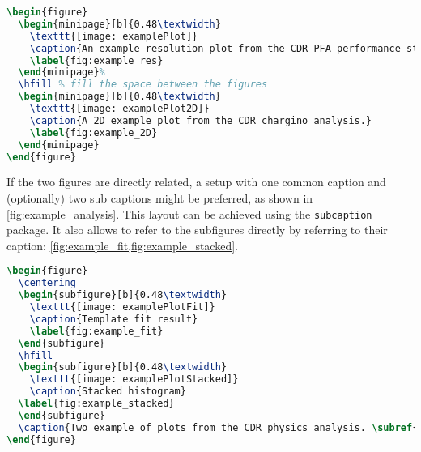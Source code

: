 \begin{lstlisting}[language=TeX]
\begin{figure}
  \begin{minipage}[b]{0.48\textwidth}
    \texttt{[image: examplePlot]}
    \caption{An example resolution plot from the CDR PFA performance studies.}
    \label{fig:example_res}
  \end{minipage}%
  \hfill % fill the space between the figures
  \begin{minipage}[b]{0.48\textwidth}
    \texttt{[image: examplePlot2D]}
    \caption{A 2D example plot from the CDR chargino analysis.}
    \label{fig:example_2D}
  \end{minipage}
\end{figure}
\end{lstlisting}
If the two figures are directly related, a setup with one common caption and (optionally) two sub captions might be preferred, as shown in \cref{fig:example_analysis}. This layout can be achieved using the \texttt{subcaption} package. It also allows to refer to the subfigures directly by referring to their caption: \cref{fig:example_fit,fig:example_stacked}.

\begin{lstlisting}[language=TeX]
\begin{figure}
  \centering
  \begin{subfigure}[b]{0.48\textwidth}
    \texttt{[image: examplePlotFit]}
    \caption{Template fit result}
    \label{fig:example_fit}
  \end{subfigure}
  \hfill
  \begin{subfigure}[b]{0.48\textwidth}
    \texttt{[image: examplePlotStacked]}
    \caption{Stacked histogram}
  \label{fig:example_stacked}
  \end{subfigure}
  \caption{Two example of plots from the CDR physics analysis. \subref{fig:example_fit} a template fit from the squark analysis and \subref{fig:example_stacked} a stacked histogram from the $\PH \to \PQb\PAQb$ analysis.}\label{fig:example_analysis}
\end{figure}
\end{lstlisting}

